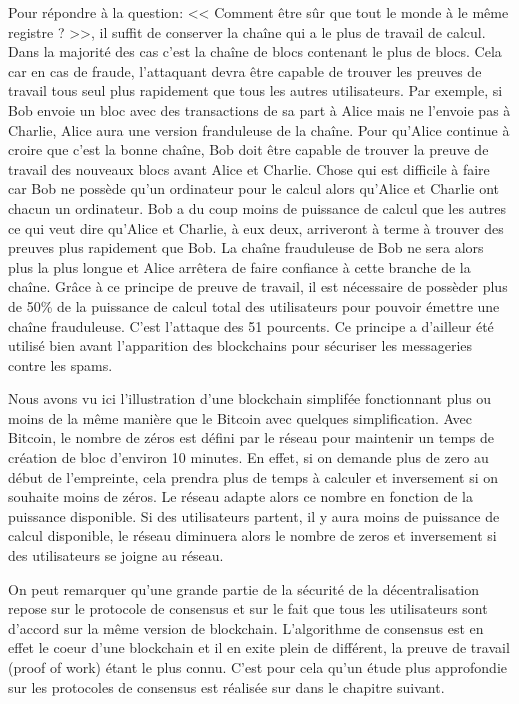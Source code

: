 Pour répondre à la question: << Comment être sûr que tout le monde à le même registre ? >>, il suffit de conserver la chaîne qui a le plus de travail de calcul. Dans la majorité des cas c'est la chaîne de blocs contenant le plus de blocs. Cela car en cas de fraude, l'attaquant devra être capable de trouver les preuves de travail tous seul plus rapidement que tous les autres utilisateurs. Par exemple, si Bob envoie un bloc avec des transactions de sa part à Alice mais ne l'envoie pas à Charlie, Alice aura une version franduleuse de la chaîne. Pour qu'Alice continue à croire que c'est la bonne chaîne, Bob doit être capable de trouver la preuve de travail des nouveaux blocs avant Alice et Charlie. Chose qui est difficile à faire car Bob ne possède qu'un ordinateur pour le calcul alors qu'Alice et Charlie ont chacun un ordinateur. Bob a du coup moins de puissance de calcul que les autres ce qui veut dire qu'Alice et Charlie, à eux deux, arriveront à terme à trouver des preuves plus rapidement que Bob. La chaîne frauduleuse de Bob ne sera alors plus la plus longue et Alice arrêtera de faire confiance à cette branche de la chaîne. Grâce à ce principe de preuve de travail, il est nécessaire de possèder plus de 50\% de la puissance de calcul total des utilisateurs pour pouvoir émettre une chaîne frauduleuse. C'est l'attaque des 51 pourcents. Ce principe a d'ailleur été utilisé bien avant l'apparition des blockchains pour sécuriser les messageries contre les spams.

Nous avons vu ici l'illustration d'une blockchain simplifée fonctionnant plus ou moins de la même manière que le Bitcoin avec quelques simplification. Avec Bitcoin, le nombre de zéros est défini par le réseau pour maintenir un temps de création de bloc d'environ 10 minutes. En effet, si on demande plus de zero au début de l'empreinte, cela prendra plus de temps à calculer et inversement si on souhaite moins de zéros. Le réseau adapte alors ce nombre en fonction de la puissance disponible. Si des utilisateurs partent, il y aura moins de puissance de calcul disponible, le réseau diminuera alors le nombre de zeros et inversement si des utilisateurs se joigne au réseau.

On peut remarquer qu'une grande partie de la sécurité de la décentralisation repose sur le protocole de consensus et sur le fait que tous les utilisateurs sont d'accord sur la même version de blockchain. L'algorithme de consensus est en effet le coeur d'une blockchain et il en exite plein de différent, la preuve de travail (proof of work) étant le plus connu. C'est pour cela qu'un étude plus approfondie sur les protocoles de consensus est réalisée sur dans le chapitre suivant.
